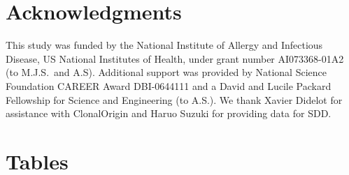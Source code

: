 \documentclass[12pt]{article}
\begin{document}
\section*{Acknowledgments}

This study was funded by the National Institute of Allergy and Infectious
Disease, US National Institutes of Health, under grant number AI073368-01A2
(to M.J.S.\ and A.S).  Additional support was provided by National Science
Foundation CAREER Award DBI-0644111 and a David and Lucile Packard
Fellowship for Science and Engineering (to A.S.).  We thank Xavier Didelot
for assistance with ClonalOrigin and Haruo Suzuki for providing data for
SDD.



\renewcommand*{\refname}{Literature Cited}


\clearpage{}


\section*{Tables}
\end{document}
